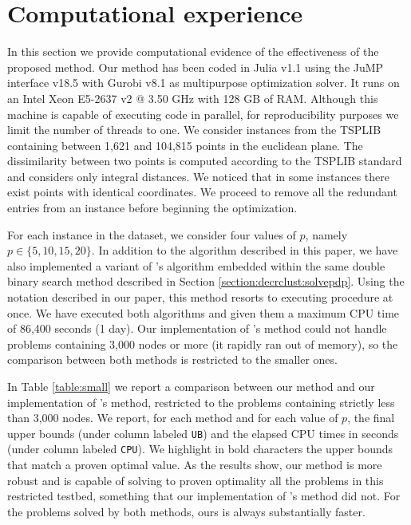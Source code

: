 \documentclass[ijoo,nonblindrev]{informs-ijoo}
\begin{document}
\section{Computational experience\label{section:computation}}

In this section we provide computational evidence of the effectiveness of the proposed method. Our method has been coded in Julia v1.1 using the JuMP interface v18.5 with Gurobi v8.1 as multipurpose optimization solver. It runs on an Intel Xeon E5-2637 v2 @ 3.50 GHz with 128 GB of RAM. Although this machine is capable of executing code in parallel, for reproducibility purposes we limit the number of threads to one. We consider instances from the TSPLIB containing between 1,621 and 104,815 points in the euclidean plane. The dissimilarity between two points is computed according to the TSPLIB standard and considers only integral distances. We noticed that in some instances there exist points with identical coordinates. We proceed to remove all the redundant entries from an instance before beginning the optimization.

For each instance in the dataset, we consider four values of $p$, namely $p\in\{5, 10, 15, 20\}$. In addition to the algorithm described in this paper, we have also implemented a variant of \citet{Sayah2017new}'s algorithm embedded within the same double binary search method described in Section \ref{section:decrclust:solvepdp}. Using the notation described in our paper, this method resorts to executing procedure  at once. We have executed both algorithms and given them a maximum CPU time of 86,400 seconds (1 day). Our implementation of \citeauthor{Sayah2017new}'s method could not handle problems containing 3,000 nodes or more (it rapidly ran out of memory), so the comparison between both methods is restricted to the smaller ones.

In Table \ref{table:small} we report a comparison between our method and our implementation of \citeauthor{Sayah2017new}'s method, restricted to the problems containing strictly less than 3,000 nodes. We report, for each method and for each value of $p$, the final upper bounds (under column labeled \texttt{UB}) and the elapsed CPU times in seconds (under column labeled \texttt{CPU}). We highlight in bold characters the upper bounds that match a proven optimal value. As the results show, our method is more robust and is capable of solving to proven optimality all the problems in this restricted testbed, something that our implementation of \citeauthor{Sayah2017new}'s method did not. For the problems solved by both methods, ours is always substantially faster.
\end{document}

